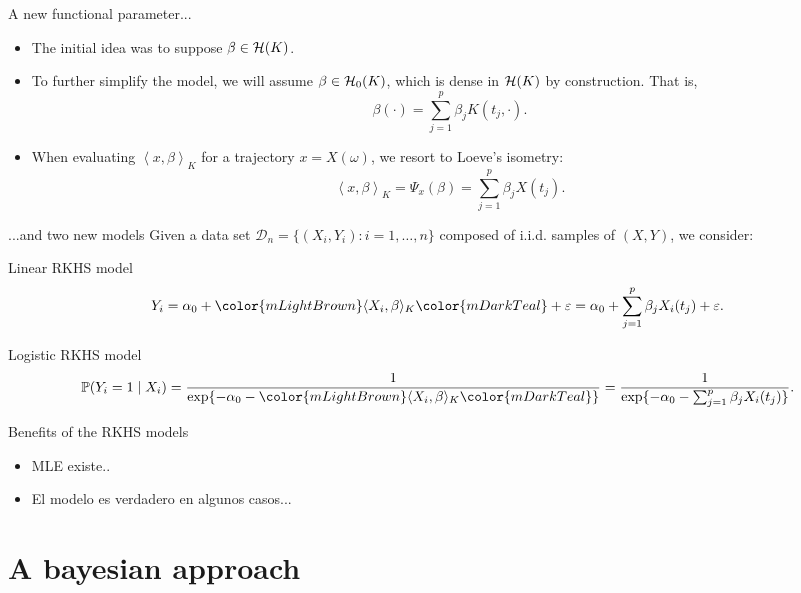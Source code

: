 \documentclass[10pt, english, professionalfonts]{beamer}
\newcommand\maroon[1]{\color{mLightBrown}#1\color{mDarkTeal}}
\newcommand{\Hcal}{\ensuremath\mathcal{H}}
\newcommand\dotprod[2]{\left\langle #1, #2 \right\rangle}
\begin{document}
\begin{frame}{A new functional parameter...}
  \begin{itemize}
    \item The initial idea was to suppose \(\beta \in \Hcal(K)\).
    \item To further simplify the model, we will assume \(\beta \in \Hcal_0(K)\), which is dense in \(\Hcal(K)\) by construction. That is,
    \[
      \beta(\cdot) = \sum_{j=1}^p \beta_j K(t_j, \cdot).
    \]
    \item When evaluating \(\dotprod{x}{\beta}_K\) for a trajectory \(x=X(\omega)\), we resort to Loeve's isometry:
    \[
      \dotprod{x}{\beta}_K = \Psi_x(\beta) = \sum_{j=1}^p \beta_j X(t_j).
    \]
  \end{itemize}

\end{frame}


\begin{frame}{...and two new models}
  Given a data set \(\mathcal D_n = \{(X_i, Y_i): i=1,\dots, n\}\) composed of i.i.d. samples of \((X, Y)\), we consider:

  \vspace{1em}

  \begin{block}{Linear RKHS model}
  \[
    Y_i = \alpha_0 + \maroon{\langle X_i, \beta \rangle_K} + \varepsilon = \alpha_0 + \sum_{j=1}^p \beta_j X_i(t_j) + \varepsilon.
  \]
\end{block}
\begin{block}{Logistic RKHS model}
    \[
    \mathbb P (Y_i=1\mid X_i) = \frac{1}{\exp\{-\alpha_0 - \maroon{\langle X_i, \beta\rangle_K}\}} = \frac{1}{\exp\{-\alpha_0 - \sum_{j=1}^p \beta_j X_i(t_j)\}}.
  \]
\end{block}
\end{frame}

\begin{frame}{Benefits of the RKHS models}
  \begin{itemize}
    \item MLE existe..
    \item El modelo es verdadero en algunos casos...
  \end{itemize}
\end{frame}

\section{A bayesian approach}
\end{document}
